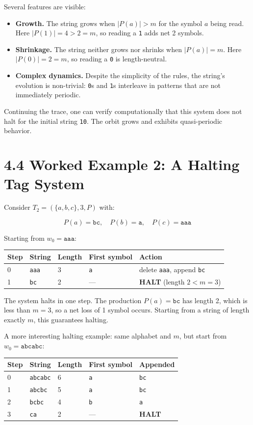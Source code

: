 Several features are visible:

\begin{itemize}
  \item \textbf{Growth.} The string grows when $|P(a)| > m$ for the symbol $a$ being read. Here $|P(1)| = 4 > 2 = m$, so reading a \texttt{1} adds net 2 symbols.
  \item \textbf{Shrinkage.} The string neither grows nor shrinks when $|P(a)| = m$. Here $|P(0)| = 2 = m$, so reading a \texttt{0} is length-neutral.
  \item \textbf{Complex dynamics.} Despite the simplicity of the rules, the string's evolution is non-trivial: \texttt{0}s and \texttt{1}s interleave in patterns that are not immediately periodic.
\end{itemize}

Continuing the trace, one can verify computationally that this system does not halt for the initial string \texttt{10}. The orbit grows and exhibits quasi-periodic behavior.

\section{4.4 Worked Example 2: A Halting Tag System}

Consider $T_2 = (\{ a, b, c\} , 3, P)$ with:

\[
P(a) = \texttt{bc}, \quad P(b) = \texttt{a}, \quad P(c) = \texttt{aaa}
\]

Starting from $w_0 = \texttt{aaa}$:

\begin{tabular}{|l|l|l|l|l|}
\hline
Step & String & Length & First symbol & Action \\
\hline
0 & \texttt{aaa} & 3 & \texttt{a} & delete \texttt{aaa}, append \texttt{bc} \\
1 & \texttt{bc} & 2 & --- & \textbf{HALT} (length $2 < m = 3$) \\
\hline
\end{tabular}


The system halts in one step. The production $P(a) = \texttt{bc}$ has length 2, which is less than $m = 3$, so a net loss of 1 symbol occurs. Starting from a string of length exactly $m$, this guarantees halting.

A more interesting halting example: same alphabet and $m$, but start from $w_0 = \texttt{abcabc}$:

\begin{tabular}{|l|l|l|l|l|}
\hline
Step & String & Length & First symbol & Appended \\
\hline
0 & \texttt{abcabc} & 6 & \texttt{a} & \texttt{bc} \\
1 & \texttt{abcbc} & 5 & \texttt{a} & \texttt{bc} \\
2 & \texttt{bcbc} & 4 & \texttt{b} & \texttt{a} \\
3 & \texttt{ca} & 2 & --- & \textbf{HALT} \\
\hline
\end{tabular}


